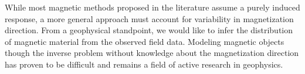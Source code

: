 While most magnetic methods proposed in the literature assume a purely induced response, a more general approach must account for variability in magnetization direction. 
From a geophysical standpoint, we would like to infer the distribution of magnetic material from the observed field data.
Modeling magnetic objects though the inverse problem without knowledge about the magnetization direction  has proven to be difficult and remains a field of active research in geophysics.
\endinput

